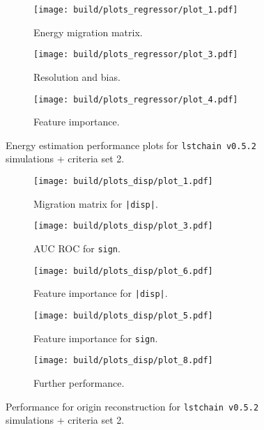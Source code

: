\begin{figure}
    \centering
    \begin{subfigure}{0.49\textwidth}
        \centering
        \texttt{[image: build/plots\_regressor/plot\_1.pdf]}
        \caption{Energy migration matrix.}
    \end{subfigure}
    \hfill
    \begin{subfigure}{0.49\textwidth}
        \centering
        \texttt{[image: build/plots\_regressor/plot\_3.pdf]}
        \caption{Resolution and bias.}
        \label{fig:regressor_newMC_150_bias}
    \end{subfigure}
    \newline\vfill
    \begin{subfigure}{0.49\textwidth}
        \centering
        \texttt{[image: build/plots\_regressor/plot\_4.pdf]}
        \caption{Feature importance.}
    \end{subfigure}
    \caption{Energy estimation performance plots for \texttt{lstchain v0.5.2} simulations + criteria set 2.}
    \label{fig:regressor_newMC_150}
\end{figure}

\begin{figure}
    \centering
    \begin{subfigure}{0.49\textwidth}
        \centering
        \texttt{[image: build/plots\_disp/plot\_1.pdf]}
        \caption{Migration matrix for \texttt{|disp|}.}
        \label{fig:origin_newMC_150_1}
    \end{subfigure}
    \hfill
    \begin{subfigure}{0.49\textwidth}
        \centering
        \texttt{[image: build/plots\_disp/plot\_3.pdf]}
        \caption{AUC ROC for \texttt{sign}.}
        \label{fig:origin_newMC_150_2}
    \end{subfigure}
    \newline\vfill
    \begin{subfigure}{0.49\textwidth}
        \centering
        \texttt{[image: build/plots\_disp/plot\_6.pdf]}
        \caption{Feature importance for \texttt{|disp|}.}
        \label{fig:origin_newMC_150_3}
    \end{subfigure}
    \hfill
    \begin{subfigure}{0.49\textwidth}
        \centering
        \texttt{[image: build/plots\_disp/plot\_5.pdf]}
        \caption{Feature importance for \texttt{sign}.}
        \label{fig:origin_newMC_150_4}
    \end{subfigure}
    \newline\vfill
    \begin{subfigure}{0.49\textwidth}
        \centering
        \texttt{[image: build/plots\_disp/plot\_8.pdf]}
        \caption{Further performance.}
        \label{fig:origin_newMC_150_4}
    \end{subfigure}
    \caption{Performance for origin reconstruction for \texttt{lstchain v0.5.2} simulations + criteria set 2.}
\end{figure}

